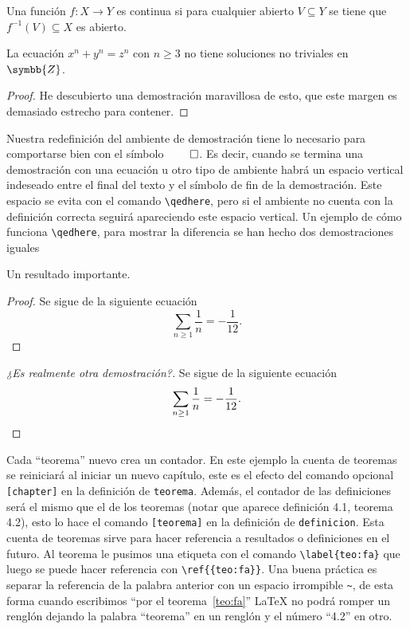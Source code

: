 \begin{definicion}
  Una función \(f\colon X\to Y\) es continua si para cualquier abierto
  \(V\subseteq Y\) se tiene que \(f^{-1}(V)\subseteq X\) es abierto.
\end{definicion}

\begin{teorema}[Fermat]%
\label{teo:fa}
  La ecuación \(x^n + y^n = z^n\) con \(n\geq 3\) no tiene soluciones no triviales en \(\symbb{Z}\).
\end{teorema}
\begin{proof}
  He descubierto una demostración maravillosa de esto, que este margen es
  demasiado estrecho para contener.
\end{proof}

Nuestra redefinición del ambiente de demostración tiene lo necesario para
comportarse bien con el símbolo \(\qed\). Es decir, cuando se termina una
demostración con una ecuación u otro tipo de ambiente habrá un espacio
vertical indeseado entre el final del texto y el símbolo de fin de la
demostración. Este espacio se evita con el comando \verb|\qedhere|, pero si
el ambiente no cuenta con la definición correcta seguirá apareciendo este
espacio vertical. Un ejemplo de cómo funciona \verb|\qedhere|, para mostrar
la diferencia se han hecho dos demostraciones iguales

\begin{teorema}
  Un resultado importante.
\end{teorema}
\begin{proof}
  Se sigue de la siguiente ecuación
  \[
    \sum_{n\geq 1}\frac{1}{n}=-\frac{1}{12}.
  \]
\end{proof}
\begin{proof}[¿Es realmente otra demostración?]
  Se sigue de la siguiente ecuación
  \[
    \sum_{n\geq 1}\frac{1}{n}=-\frac{1}{12}. \qedhere
  \]
\end{proof}

Cada ``teorema'' nuevo crea un contador. En este ejemplo la cuenta de
teoremas se reiniciará al iniciar un nuevo capítulo, este es el efecto del
comando opcional \texttt{[chapter]} en la definición de \texttt{teorema}.
Además, el contador de las definiciones será el mismo que el de los teoremas
(notar que aparece definición 4.1, teorema 4.2), esto lo hace el comando
\texttt{[teorema]} en la definición de \texttt{definicion}. Esta cuenta de
teoremas sirve para hacer referencia a resultados o definiciones en el
futuro. Al teorema le pusimos una etiqueta con el comando
\verb|\label{teo:fa}| que luego se puede hacer referencia con
\verb|\ref{{teo:fa}}|. Una buena práctica es separar la referencia de la
palabra anterior con un espacio irrompible \verb|~|, de esta forma cuando
escribimos ``por el teorema~\ref{teo:fa}'' \LaTeX{} no podrá romper un
renglón dejando la palabra ``teorema'' en un renglón y el número ``4.2'' en
otro.


